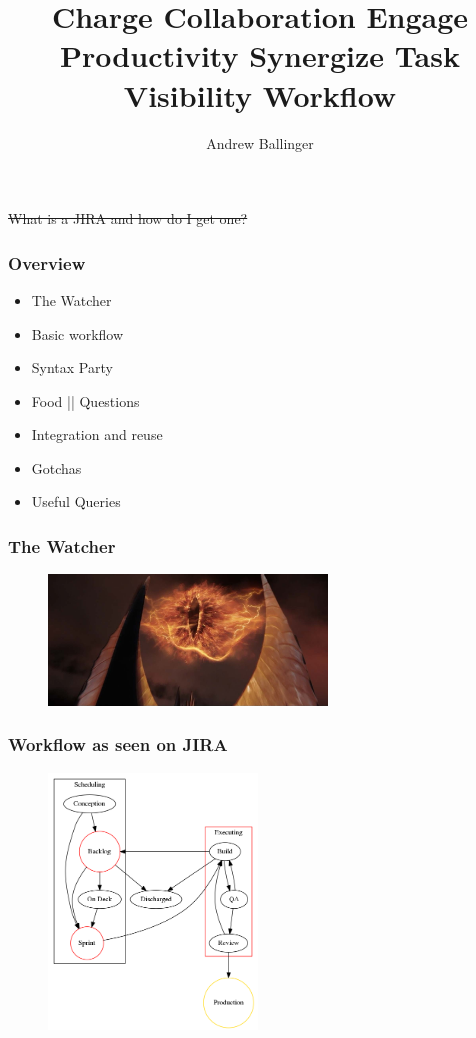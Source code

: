 \documentclass{beamer}
\title{
Charge
Collaboration
Engage
Productivity
Synergize
Task
Visibility
Workflow
}
\author{Andrew Ballinger}
\begin{document}
\frame{\titlepage}

\begin{frame}[fragile]
  
  \sout{What is a JIRA and how do I get one?}

\end{frame}

\begin{frame}[fragile]
  \frametitle{Overview}

  \begin{itemize}
  \item{The Watcher}
  \item{Basic workflow}
  \item{Syntax Party}
  \item{Food || Questions}
  \item{Integration and reuse}
  \item{Gotchas}
  \item{Useful Queries}
  \end{itemize}

\end{frame}
\begin{frame}[fragile]
  \frametitle{The Watcher}


  \begin{figure}[p]
    \centering
    \includegraphics[width=20em]{eye_of_sauron.jpg}
  \end{figure}


\end{frame}

\begin{frame}[fragile]
  
  \frametitle{Workflow as seen on JIRA}

  \begin{figure}[p]
    \centering
    \includegraphics[width=15em]{workflow.png}
  \end{figure}

\end{frame}
\end{document}
